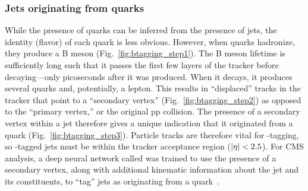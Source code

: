 \subsubsection{Jets originating from \Pb quarks}
While the presence of quarks can be inferred from the presence of jets, the identity (flavor) of each quark is less obvious. 
However, when \Pb quarks hadronize, they produce a B meson (Fig.~\ref{fig:btagging_step1}). 
The B meson lifetime is sufficiently long such that it passes the first few layers of the tracker before decaying---only picoseconds after it was produced. 
When it decays, it produces several quarks and, potentially, a lepton. 
This results in ``displaced'' tracks in the tracker that point to a ``secondary vertex'' (Fig.~\ref{fig:btagging_step2}) as opposed to the ``primary vertex,'' or the original pp collision. 
The presence of a secondary vertex within a jet therefore gives a unique indication that it originated from a \Pb quark (Fig.~\ref{fig:btagging_step3}). 
Particle tracks are therefore vital for \Pb-tagging, so \Pb-tagged jets must be within the tracker acceptance region ($\lvert \eta \rvert < 2.5$). 
For CMS analysis, a deep neural network called \DeepJet was trained to use the presence of a secondary vertex, along with additional kinematic information about the jet and its constituents, to ``tag'' jets as originating from a \Pb quark~\cite{Bols:2020bkb}. 

